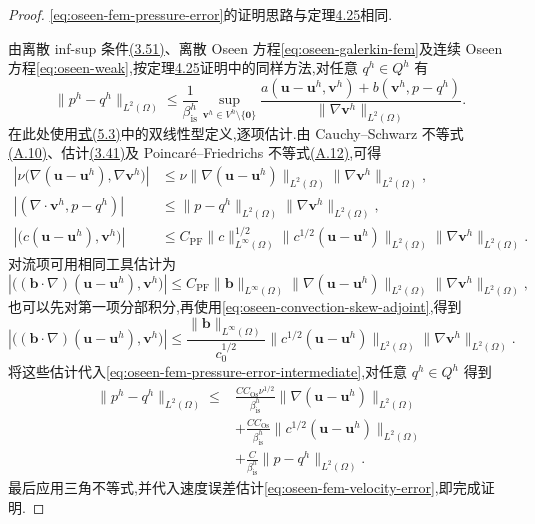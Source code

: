 \begin{proof}
\cref{eq:oseen-fem-pressure-error}的证明思路与定理\hyperref[thm:stokes-error-pressure-l2]{4.25}相同.

由离散 inf-sup 条件\hyperref[eq:discrete-infsup-condition]{(3.51)}、离散 Oseen 方程\cref{eq:oseen-galerkin-fem}及连续 Oseen 方程\cref{eq:oseen-weak},按定理\hyperref[thm:stokes-error-pressure-l2]{4.25}证明中的同样方法,对任意 $q^h\in Q^h$ 有
\begin{equation}\label{eq:oseen-fem-pressure-error-intermediate}
  \|p^h-q^h\|_{L^2(\Omega)}
  \le\frac{1}{\beta_{\mathrm{is}}^h}
     \sup_{\bm{v}^h\in V^h\setminus\{\bm{0}\}}
     \frac{a(\bm{u}-\bm{u}^h,\bm{v}^h)
       +b(\bm{v}^h,p-q^h)}
          {\|\nabla\bm{v}^h\|_{L^2(\Omega)}}.
\end{equation}
在此处使用\hyperref[eq:oseen-bilinear-forms]{式(5.3)}中的双线性型定义,逐项估计.由 Cauchy--Schwarz 不等式\hyperref[eq:appendix-a-10]{(A.10)}、估计\hyperref[eq:divergence-gradient-bound-h1]{(3.41)}及 Poincaré--Friedrichs 不等式\hyperref[eq:appendix-a-12]{(A.12)},可得
\[
\begin{aligned}
\left|\nu\bigl(\nabla(\bm{u}-\bm{u}^h),\nabla\bm{v}^h\bigr)\right|
  &\le\nu\|\nabla(\bm{u}-\bm{u}^h)\|_{L^2(\Omega)}
       \|\nabla\bm{v}^h\|_{L^2(\Omega)},\\
\left|(\nabla\cdot\bm{v}^h,p-q^h)\right|
  &\le\|p-q^h\|_{L^2(\Omega)}
       \|\nabla\bm{v}^h\|_{L^2(\Omega)},\\
\left|\bigl(c(\bm{u}-\bm{u}^h),\bm{v}^h\bigr)\right|
  &\le C_{\mathrm{PF}}\|c\|_{L^\infty(\Omega)}^{1/2}
       \|c^{1/2}(\bm{u}-\bm{u}^h)\|_{L^2(\Omega)}
       \|\nabla\bm{v}^h\|_{L^2(\Omega)}.
\end{aligned}
\]
对流项可用相同工具估计为
\[
\left|\bigl((\bm{b}\cdot\nabla)(\bm{u}-\bm{u}^h),
       \bm{v}^h\bigr)\right|
  \le C_{\mathrm{PF}}\|\bm{b}\|_{L^\infty(\Omega)}
       \|\nabla(\bm{u}-\bm{u}^h)\|_{L^2(\Omega)}
       \|\nabla\bm{v}^h\|_{L^2(\Omega)},
\]
也可以先对第一项分部积分,再使用\cref{eq:oseen-convection-skew-adjoint},得到
\[
\left|\bigl((\bm{b}\cdot\nabla)(\bm{u}-\bm{u}^h),
       \bm{v}^h\bigr)\right|
  \le\frac{\|\bm{b}\|_{L^\infty(\Omega)}}{c_0^{1/2}}
       \|c^{1/2}(\bm{u}-\bm{u}^h)\|_{L^2(\Omega)}
       \|\nabla\bm{v}^h\|_{L^2(\Omega)}.
\]
将这些估计代入\cref{eq:oseen-fem-pressure-error-intermediate},对任意 $q^h\in Q^h$ 得到
\[
\begin{aligned}
  \|p^h-q^h\|_{L^2(\Omega)}
   \le{}&\frac{C C_{\mathrm{Os}}\nu^{1/2}}{\beta_{\mathrm{is}}^h}
       \|\nabla(\bm{u}-\bm{u}^h)\|_{L^2(\Omega)}\\
   &+\frac{C C_{\mathrm{Os}}}{\beta_{\mathrm{is}}^h}
       \|c^{1/2}(\bm{u}-\bm{u}^h)\|_{L^2(\Omega)}\\
   &+\frac{C}{\beta_{\mathrm{is}}^h}\|p-q^h\|_{L^2(\Omega)}.
\end{aligned}
\]
最后应用三角不等式,并代入速度误差估计\cref{eq:oseen-fem-velocity-error},即完成证明.
\end{proof}

